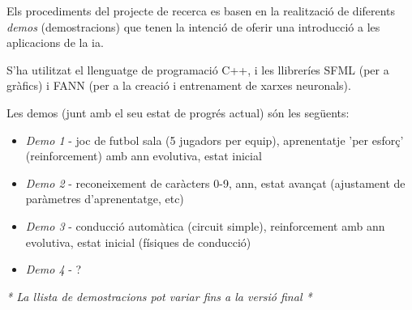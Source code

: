 Els procediments del projecte de recerca es basen en la realització de diferents \emph{demos} (demostracions)
que tenen la intenció de oferir una introducció a les aplicacions de la \ac{ia}.

S'ha utilitzat el llenguatge de programació C++, i les llibreríes SFML \autocite{sfmllib} (per a gràfics) i FANN \cite{fannlib} (per a la
creació i entrenament de xarxes neuronals).

Les demos (junt amb el seu estat de progrés actual) són les següents:

\begin{itemize}
\item \emph{Demo 1} - joc de futbol sala (5 jugadors per equip), aprenentatje 'per esforç' (reinforcement) amb \ac{ann} evolutiva, estat inicial
\item \emph{Demo 2} - reconeixement de caràcters 0-9, \ac{ann}, estat avançat (ajustament de paràmetres d'aprenentatge, etc)
\item \emph{Demo 3} - conducció automàtica (circuit simple), reinforcement amb \ac{ann} evolutiva, estat inicial (físiques de conducció)
\item \emph{Demo 4} - ?
\end{itemize}

\emph{* La llista de demostracions pot variar fins a la versió final *}
